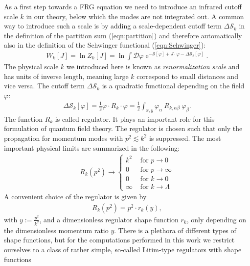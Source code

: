 As a first step towards a FRG equation we need to introduce an infrared cutoff scale $k$ in our theory, below which the modes are not integrated out. A common way to introduce such a scale is by  adding a scale-dependent cutoff term $\Delta\mathcal{S}_k$ in the definition of the partition sum (\ref{eqn:partition}) and therefore automatically also in the definition of the Schwinger functional (\ref{eqn:Schwinger}):
\begin{align}
W_{k}[J]=\ln Z_{k}[J]=\ln \int \mathcal{D} \varphi  \operatorname{e}^{-\mathcal{S}[\varphi]+J \cdot \varphi-\Delta \mathcal{S}_{k}[\varphi]}.
\label{eqn:Wk}
\end{align}
The physical scale $k$ we introduced here is known as \textit{renormalization scale} and has units of inverse length, meaning large $k$ correspond to small distances and vice versa. The cutoff term $\Delta\mathcal{S}_k$ is a quadratic functional depending on the field $\varphi$:
\begin{align}
	\Delta \mathcal{S}_{k}[\varphi]=\frac{1}{2} \varphi \cdot R_{k} \cdot \varphi=\frac{1}{2} \int_{x, y} \varphi_{\alpha} \ R_{k, \alpha\beta} \ \varphi_{\beta}.
\end{align}
The function $R_k$ is called regulator. It plays an important role for this formulation of quantum field theory. The regulator is chosen such that only the propagation for momentum modes with $p^2 \lesssim k^2$ is suppressed. The most important physical limits are summarized in the following:
\begin{align}
	R_{k}(p^2) \rightarrow\left\{\begin{array}{ll}{k^{2}} & {\text { for } p \rightarrow 0} \\ {0} & {\text { for } p \rightarrow \infty} \\ {0} & {\text { for } k \rightarrow 0} \\ {\infty} & {\text { for } k \rightarrow \Lambda}\end{array}\right.
\label{eqn:regulator_limits}
\end{align}
A convenient choice of the regulator is given by
\begin{align}
	R_k(p^2) = p^2 \cdot r_k(y),
\end{align}
with $ y := \frac{p^2}{k^2}$, and a dimensionless regulator shape function $r_k$, only depending on the dimensionless momentum ratio $y$. There is a plethora of different types of shape functions, but for the computations performed in this work we restrict ourselves to a class of rather simple, so-called Litim-type regulators with shape functions

